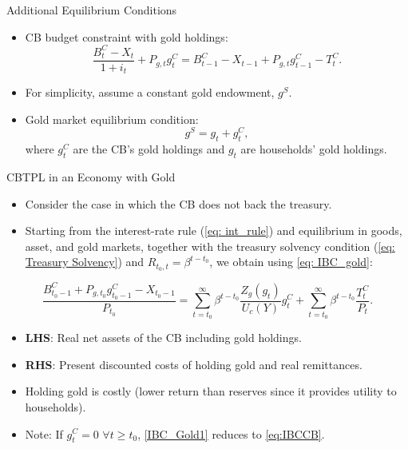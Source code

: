 \documentclass[11pt,aspectratio=169]{beamer}
\begin{document}
\begin{frame}{Additional Equilibrium Conditions}
\begin{itemize}
    \item CB budget constraint with gold holdings:
    \begin{equation}
    \frac{B_{t}^{C}-X_{t}}{1+i_{t}} + P_{g,t} g_{t}^{C} =
    B_{t-1}^{C}-X_{t-1} + P_{g,t} g_{t-1}^{C} - T_{t}^{C}.
    \label{BC_gold}
    \end{equation}
    \vspace{0.2cm}
    \item For simplicity, assume a constant gold endowment, $g^S$.
     \vspace{0.2cm}
    \item Gold market equilibrium condition:
    \begin{equation}
        g^S = g_t + g_t^C,
    \end{equation}
    where $g_t^C$ are the CB’s gold holdings and $g_t$ are households’ gold holdings.
\end{itemize}
\end{frame}

\begin{frame}{CBTPL in an Economy with Gold}

\begin{itemize}
\item Consider the case in which the CB does not back the treasury.
    \item Starting from the interest-rate rule (\ref{eq: int_rule}) and equilibrium in goods, asset, and gold markets, together with the treasury solvency condition (\ref{eq: Treasury Solvency}) and $R_{t_0,t} = \beta^{t-t_0}$, we obtain using \eqref{eq: IBC_gold}:
\end{itemize}

\begin{equation}
\frac{B_{t_0-1}^{C}+P_{g,t_0} g_{t_0-1}^{C}-X_{t_0-1}}{P_{t_0}} =
\sum_{t=t_0}^{\infty} \beta^{t-t_0} \frac{Z_g(g_t)}{U_c(Y)} g_t^C +
\sum_{t=t_0}^{\infty} \beta^{t-t_0} \frac{T_t^C}{P_t}. 
\label{IBC_Gold1}
\end{equation}

\begin{itemize}
    \item \textbf{LHS}: Real net assets of the CB including gold holdings.  
    \item \textbf{RHS}: Present discounted costs of holding gold and real remittances.  
    \item Holding gold is costly (lower return than reserves since it provides utility to households).  
    \item Note: If $g_t^C = 0$ $\forall t \ge t_0$, \eqref{IBC_Gold1} reduces to \eqref{eq:IBCCB}.
\end{itemize}
\end{frame}
\end{document}
